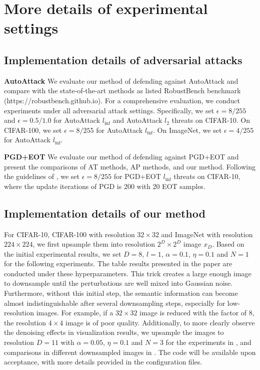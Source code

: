 \section{More details of experimental settings}
\label{app:settings}

\subsection{Implementation details of adversarial attacks}
\textbf{AutoAttack} \quad We evaluate our method of defending against AutoAttack \citep{croce2020reliable} and compare with the state-of-the-art methods as listed RobustBench benchmark (https://robustbench.github.io). For a comprehensive evaluation, we conduct experiments under all adversarial attack settings. Specifically, we set $\epsilon=8/255$ and $\epsilon=0.5/1.0$ for AutoAttack $l_{\inf}$ and AutoAttack $l_2$ threats on CIFAR-10. On CIFAR-100, we set $\epsilon=8/255$ for AutoAttack $l_{\inf}$. On ImageNet, we set $\epsilon=4/255$ for AutoAttack $l_{\inf}$.

\textbf{PGD+EOT} \quad We evaluate our method of defending against PGD+EOT \citep{madry2018towards,athalye2018synthesizing} and present the comparisons of AT methods, AP methods, and our method. Following the guidelines of \citet{lee2023robust}, we set $\epsilon=8/255$ for PGD+EOT $l_{\inf}$ threats on CIFAR-10, where the update iterations of PGD is 200 with 20 EOT samples.



\subsection{Implementation details of our method}
For CIFAR-10, CIFAR-100 with resolution $32 \times 32$ and ImageNet with resolution $224 \times 224$, we first upsample them into resolution $2^D \times 2^D$ image $x_{D}$. Based on the initial experimental results, we set  $D = 8$, $l = 1$, $\alpha=0.1$, $\eta=0.1$ and $N=1$ for the following experiments. The table results presented in the paper are conducted under these hyperparameters. This trick creates a large enough image to downsample until the perturbations are well mixed into Gaussian noise. Furthermore, without this initial step, the semantic information can become almost indistinguishable after several downsampling steps, especially for low-resolution images.
For example, if a $32\times 32$ image is reduced with the factor of 8, the resolution $4\times 4$ image is of poor quality. Additionally, to more clearly observe the denoising effects in visualization results, we upsample the images to resolution $D=11$ with $\alpha=0.05$, $\eta=0.1$ and $N=3$ for the experiments in , and comparisons in different downsampled images in . The code will be available upon acceptance, with more details provided in the configuration files.

